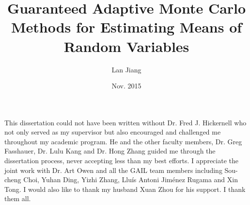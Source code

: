 \documentclass{iitthesis}
\begin{document}

\title{Guaranteed Adaptive Monte Carlo Methods for Estimating Means of Random Variables}
\author{Lan Jiang}
 
\date{Nov. 2015}
\maketitle                %


\prelimpages         %


\begin{acknowledgement}     %
\par  This dissertation could not have been written without Dr. Fred
J. Hickernell who not only served as my supervisor but also encouraged and challenged me throughout my academic program. He and the other faculty members, Dr. Greg Fasshauer, Dr. Lulu Kang and Dr. Hong Zhang guided me through the dissertation process, never accepting less than my best efforts. I appreciate the joint work with Dr. Art Owen and all the GAIL team members including Sou-cheng Choi, Yuhan Ding, Yizhi Zhang, Llu{\'i}s Antoni Jim{\'e}nez Rugama and Xin Tong. I would also like to thank my husband Xuan Zhou for his support. I thank them all.
\end{acknowledgement}


\tableofcontents
 \clearpage



\listoffigures

\clearpage
\end{document}

